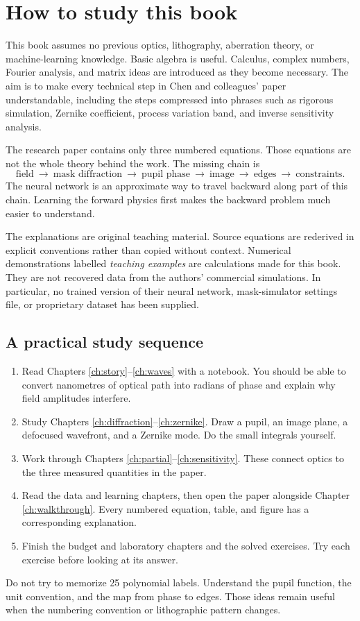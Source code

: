 \chapter*{How to study this book}
This book assumes no previous optics, lithography, aberration theory, or
machine-learning knowledge. Basic algebra is useful. Calculus, complex
numbers, Fourier analysis, and matrix ideas are introduced as they become
necessary. The aim is to make every technical step in Chen and colleagues'
paper \cite{chen} understandable, including the steps compressed into
phrases such as rigorous simulation, Zernike coefficient, process variation
band, and inverse sensitivity analysis.

The research paper contains only three numbered equations. Those equations
are not the whole theory behind the work. The missing chain is
\[
\text{field}\ \longrightarrow\ \text{mask diffraction}\
\longrightarrow\ \text{pupil phase}\ \longrightarrow\ \text{image}\
\longrightarrow\ \text{edges}\ \longrightarrow\ \text{constraints}.
\]
The neural network is an approximate way to travel backward along part of
this chain. Learning the forward physics first makes the backward problem
much easier to understand.

The explanations are original teaching material. Source equations are
rederived in explicit conventions rather than copied without context.
Numerical demonstrations labelled \emph{teaching examples} are calculations
made for this book. They are not recovered data from the authors' commercial
simulations. In particular, no trained version of their neural network,
mask-simulator settings file, or proprietary dataset has been supplied.

\section*{A practical study sequence}
\begin{enumerate}
\item Read Chapters \ref{ch:story}--\ref{ch:waves} with a notebook. You
should be able to convert nanometres of optical path into radians of phase
and explain why field amplitudes interfere.
\item Study Chapters \ref{ch:diffraction}--\ref{ch:zernike}. Draw a pupil,
an image plane, a defocused wavefront, and a Zernike mode. Do the small
integrals yourself.
\item Work through Chapters \ref{ch:partial}--\ref{ch:sensitivity}.
These connect optics to the three measured quantities in the paper.
\item Read the data and learning chapters, then open the paper alongside
Chapter \ref{ch:walkthrough}. Every numbered equation, table, and figure
has a corresponding explanation.
\item Finish the budget and laboratory chapters and the solved exercises.
Try each exercise before looking at its answer.
\end{enumerate}
Do not try to memorize 25 polynomial labels. Understand the pupil function,
the unit convention, and the map from phase to edges. Those ideas remain
useful when the numbering convention or lithographic pattern changes.

